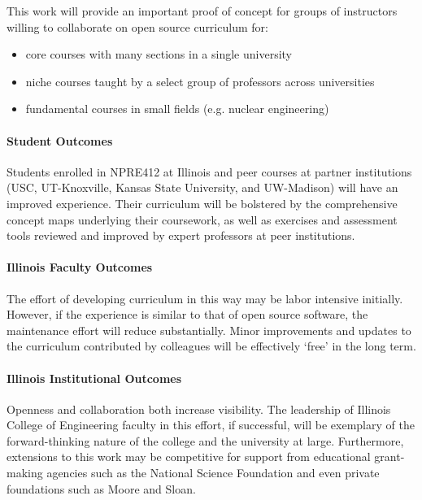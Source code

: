\documentclass[11pt]{article}
\begin{document}
          This work will provide an important proof of concept for groups of 
          instructors willing to collaborate on open source curriculum for:
          \begin{itemize}
                  \item core courses with many sections in a single university
                  \item niche courses taught by a select group of professors across 
          universities
                  \item fundamental courses in small fields (e.g. nuclear engineering)
          \end{itemize}

          \paragraph{Student Outcomes}
          Students enrolled in NPRE412 at Illinois and peer courses at partner 
          institutions (USC, UT-Knoxville, Kansas State University, and 
          UW-Madison) will have an improved experience. Their 
          curriculum will be bolstered by the comprehensive concept maps 
          underlying their coursework\cite{novak_concept_1990}, as well as exercises 
          and assessment tools reviewed and improved by expert professors at 
          peer institutions. 

          \paragraph{Illinois Faculty Outcomes}
          The effort of developing curriculum in this way may be labor 
          intensive initially. However, if the experience is similar to that of 
          open source software, the maintenance effort will reduce 
          substantially. Minor improvements and updates to the curriculum 
          contributed by colleagues will be effectively `free' in the long 
          term. 

          \paragraph{Illinois Institutional Outcomes} Openness and collaboration 
          both increase visibility. The leadership of Illinois College of 
          Engineering faculty in this effort, if successful, will be exemplary 
          of the forward-thinking nature of the college and the university at 
          large. Furthermore, extensions to this work may be competitive for  
          support from educational grant-making agencies such as the National 
          Science Foundation and even private foundations such as Moore and 
          Sloan. 
\end{document}
